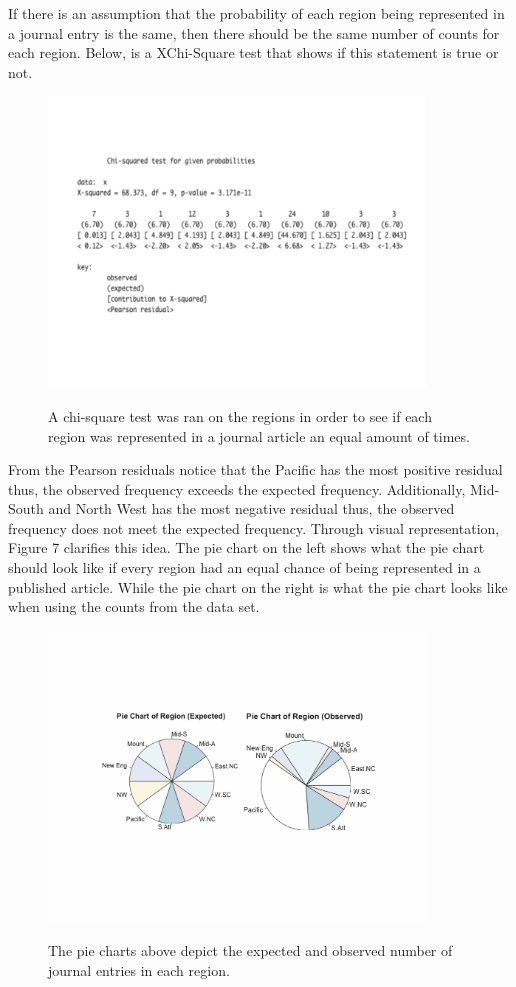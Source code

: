 \documentclass[12pt, letterpaper]{article}
\begin{document}
If there is an assumption that the probability of each region being represented in a journal entry is the same, then there should be the same number of counts for each region. Below, is a XChi-Square test that shows if this statement is true or not. 
\begin{figure}[!h]
\begin{center}
\includegraphics[width=10cm]{RegionChiSquare1.pdf}
\label{fig: Region XChi-Square}
\caption{A chi-square test was ran on the regions in order to see if each region was represented in a journal article an equal amount of times.}
\end{center}
\end{figure}
From the Pearson residuals notice that the Pacific has the most positive residual thus, the observed frequency exceeds the expected frequency. Additionally, Mid-South and North West has the most negative residual thus, the observed frequency does not meet the expected frequency. Through visual representation, Figure 7 clarifies this idea. The pie chart on the left shows what the pie chart should look like if every region had an equal chance of being represented in a published article. While the pie chart on the right is what the pie chart looks like when using the counts from the data set. 
\begin{figure}[!h]
\begin{center}
\includegraphics[width=10cm]{RegionsPieChart.pdf}
\label{fig: Region Pie Chart}
\caption{The pie charts above depict the expected and observed number of journal entries in each region.}
\end{center}
\end{figure}
\end{document}
